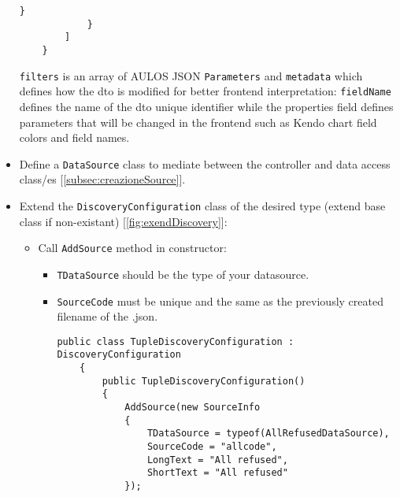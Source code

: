 \begin{itemize}
\begin{lstlisting}[caption={{sourcecode}.json example}, style=javaScriptCode]
                }
            }   
        ]
    }
    \end{lstlisting}
    \verb|filters| is an array of AULOS JSON \verb|Parameters| and \verb|metadata| which defines how the dto is modified for better frontend interpretation: \verb|fieldName| defines the name of the dto unique identifier while the properties field defines parameters that will be changed in the frontend such as Kendo chart field colors and field names.
    \item Define a \verb|DataSource| class to mediate between the controller and data access class/es [\ref{subsec:creazioneSource}].
    \item Extend the \verb|DiscoveryConfiguration| class of the desired type (extend base class if non-existant) [\ref{fig:exendDiscovery}]:
    \begin{itemize}
        \item Call \verb|AddSource| method in constructor:
        \begin{itemize}
            \item \verb|TDataSource| should be the type of your datasource.
            \item \verb|SourceCode| must be unique and the same as the previously created filename of the .json.
            \begin{lstlisting}[caption={TupleDiscoveryConfiguration example}, style=javaScriptCode]
public class TupleDiscoveryConfiguration : DiscoveryConfiguration
    {
        public TupleDiscoveryConfiguration()
        {
            AddSource(new SourceInfo
            {
                TDataSource = typeof(AllRefusedDataSource),
                SourceCode = "allcode",
                LongText = "All refused",
                ShortText = "All refused"
            });


\end{lstlisting}
\end{itemize}
\end{itemize}
\end{itemize}
